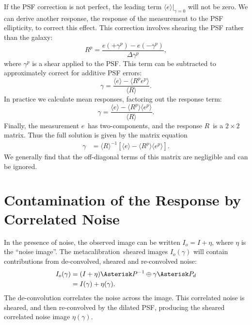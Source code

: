 \documentclass[usegraphicx,usenatbib]{mn2e}
\newcommand{\est}{$e$}
\newcommand{\mest}{e}
\newcommand{\mcal}{metacalibration}
\newcommand{\mcalR}{$R$}
\newcommand{\mcalRpsf}{$R^{p}$}
\begin{document}
If the PSF correction is not perfect, the leading term $\langle \mest \rangle|_{\gamma=0}$
will not be zero.  We can derive another response, the response of the
measurement to the PSF ellipticity, to correct this effect.  This
correction involves shearing the PSF rather than the galaxy:
\begin{equation}
    \mbox{\mcalRpsf} = \frac{\mest(+\gamma^{p}) - \mest(-\gamma^{p})}{\Delta \gamma^{p}},
\end{equation}
where $\gamma^{p}$ is a shear applied to the PSF.  
This term can be subtracted to approximately correct for additive PSF errors:
\begin{equation}
    \gamma = \frac{\langle \mest \rangle - \langle \mbox{\mcalRpsf} e^{p} \rangle}{ \langle \mbox{\mcalR} \rangle}.
\end{equation}
In practice we calculate mean responses, factoring out the response term:
\begin{equation}
    \gamma = \frac{\langle \mest \rangle - \langle \mbox{\mcalRpsf} \rangle \langle e^{p} \rangle}{ \langle \mbox{\mcalR} \rangle}.
\end{equation}
Finally, the measurement \est\ has two-components, and the response \mcalR\ is
a $2 \times 2$ matrix. Thus the full solution is given by the matrix
equation
\begin{align}
    \gamma &= 
    \langle \mbox{\mcalR} \rangle^{-1} \left[ \langle \mest \rangle - \langle \mbox{\mcalRpsf} \rangle \langle e^{p} \rangle \right].
\end{align}
We generally find that the off-diagonal terms of this matrix are negligible
and can be ignored.

\section{Contamination of the Response by Correlated Noise} \label{sec:contam}

In the presence of noise, the observed image can be written $I_o=I+\eta$, where $\eta$
is the ``noise image''.  The \mcal\ sheared images $I_o(\gamma)$ will contain
contributions from de-convolved, sheared and re-convolved noise:
\begin{align}
    I_{o}(\gamma) &= (I + \eta) \Asterisk P^{-1} \oplus \gamma \Asterisk P_{d} \nonumber \\
    &= I(\gamma) + \eta(\gamma).
\end{align}
The de-convolution correlates the noise
across the image.  This correlated noise is sheared, and then re-convolved by
the dilated PSF, producing the sheared correlated noise image $\eta(\gamma)$.
\end{document}
